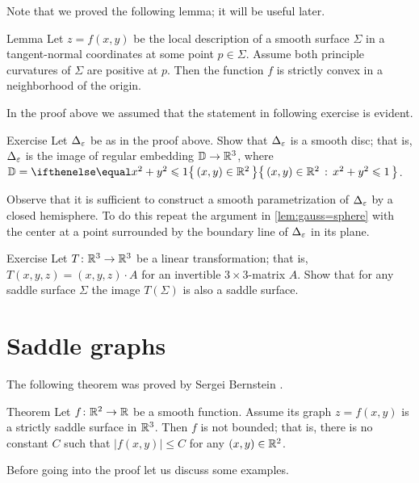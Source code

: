 Note that we proved the following lemma; it will be useful later. %

\begin{thm}{Lemma}\label{lem:gauss+=>convexity}
Let $z=f(x,y)$ be the local description of a smooth surface $\Sigma$ in a tangent-normal coordinates at some point $p\in\Sigma$.
Assume both principle curvatures of $\Sigma$ are positive at $p$.
Then the function $f$ is strictly convex in a neighborhood of the origin.
\end{thm}

In the proof above we assumed that the statement in following exercise is evident.

\begin{thm}{Exercise}\label{ex:disc-hat}
Let $\Delta_\varepsilon$ be as in the proof above.
Show that $\Delta_\varepsilon$ is a smooth disc; that is, $\Delta_\varepsilon$ is the image of regular embedding $\mathbb{D}\to \mathbb{R}^3$, where $\DD=\set{(x,y)\in\RR^2}{x^2+y^2\le 1}$.
\end{thm}

 Observe that it is sufficient to construct a smooth parametrization of $\Delta_\varepsilon$ by a closed hemisphere.
To do this repeat the argument in \ref{lem:gauss=sphere} with the center at a point surrounded by the boundary line of $\Delta_\varepsilon$ in its plane.

\begin{thm}{Exercise}\label{ex:saddle-linear}
Let $T\colon\mathbb{R}^3\to\mathbb{R}^3$ be a linear transformation; that is, $T(x,y,z)=(x,y,z)\cdot A$ for an invertible $3{\times}3$-matrix $A$. 
Show that for any saddle surface $\Sigma$ the image $T(\Sigma)$ is also a saddle surface.
\end{thm}

\section*{Saddle graphs}

The following theorem was proved by Sergei Bernstein \cite{bernstein}.

\begin{thm}{Theorem}\label{thm:bernshtein}
Let $f\colon\mathbb{R}^2\to\mathbb{R}$ be a smooth function.
Assume its graph $z=f(x,y)$ is a strictly saddle surface in $\mathbb{R}^3$.
Then $f$ is not bounded;
that is, there is no constant $C$ such that 
$|f(x,y)|\le C$ for any $(x,y)\in\mathbb{R}^2$.
\end{thm}

Before going into the proof let us discuss some examples.

